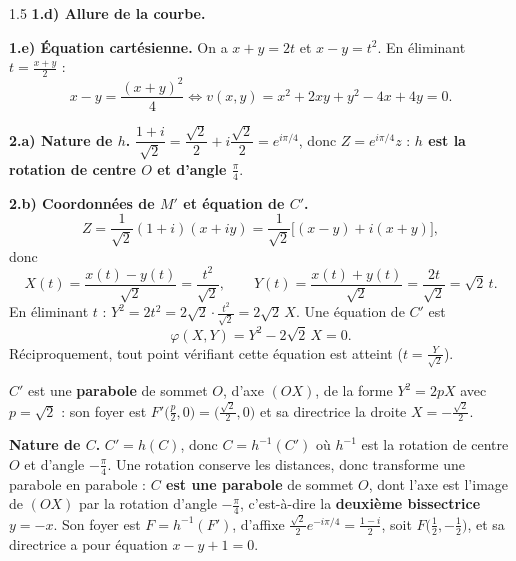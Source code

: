 \documentclass[12pt]{article}
\begin{document}
\begin{spacing}{1.5}
\textbf{1.d) Allure de la courbe.}
\begin{center}
\end{center}

\textbf{1.e) Équation cartésienne.} On a $x+y=2t$ et $x-y=t^2$. En éliminant $t=\frac{x+y}{2}$ :
\[
x-y=\frac{(x+y)^2}{4}\iff\boxed{v(x,y)=x^2+2xy+y^2-4x+4y=0}.
\]

\textbf{2.a) Nature de $h$.} $\dfrac{1+i}{\sqrt2}=\dfrac{\sqrt2}{2}+i\dfrac{\sqrt2}{2}=e^{i\pi/4}$, donc $Z=e^{i\pi/4}z$ : \textbf{$h$ est la rotation de centre $O$ et d'angle $\frac\pi4$}.

\textbf{2.b) Coordonnées de $M'$ et équation de $C'$.}
\[
Z=\frac{1}{\sqrt2}(1+i)(x+iy)=\frac{1}{\sqrt2}\big[(x-y)+i(x+y)\big],
\]
donc
\[
X(t)=\frac{x(t)-y(t)}{\sqrt2}=\frac{t^2}{\sqrt2},\qquad Y(t)=\frac{x(t)+y(t)}{\sqrt2}=\frac{2t}{\sqrt2}=\sqrt2\,t .
\]
En éliminant $t$ : $Y^2=2t^2=2\sqrt2\cdot\frac{t^2}{\sqrt2}=2\sqrt2\,X$. Une équation de $C'$ est
\[
\boxed{\varphi(X,Y)=Y^2-2\sqrt2\,X=0}.
\]
Réciproquement, tout point vérifiant cette équation est atteint ($t=\frac{Y}{\sqrt2}$).

$C'$ est une \textbf{parabole} de sommet $O$, d'axe $(OX)$, de la forme $Y^2=2pX$ avec $p=\sqrt2$ : son foyer est $F'\big(\frac{p}{2},0\big)=\big(\frac{\sqrt2}{2},0\big)$ et sa directrice la droite $X=-\frac{\sqrt2}{2}$.

\textbf{Nature de $C$.} $C'=h(C)$, donc $C=h^{-1}(C')$ où $h^{-1}$ est la rotation de centre $O$ et d'angle $-\frac\pi4$. Une rotation conserve les distances, donc transforme une parabole en parabole : \textbf{$C$ est une parabole} de sommet $O$, dont l'axe est l'image de $(OX)$ par la rotation d'angle $-\frac\pi4$, c'est-à-dire la \textbf{deuxième bissectrice} $y=-x$. Son foyer est $F=h^{-1}(F')$, d'affixe $\frac{\sqrt2}{2}e^{-i\pi/4}=\frac{1-i}{2}$, soit $F\big(\frac12,-\frac12\big)$, et sa directrice a pour équation $x-y+1=0$.


\end{spacing}
\end{document}
